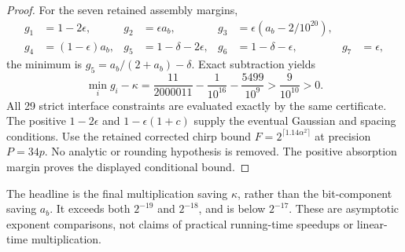 \begin{proof}
For the seven retained assembly margins,
\[
\begin{aligned}
 g_1&=1-2\epsilon,&g_2&=\epsilon a_b,&
 g_3&=\epsilon(a_b-2/10^{20}),\\
 g_4&=(1-\epsilon)a_b,&g_5&=1-\delta-2\epsilon,&
 g_6&=1-\delta-\epsilon,&g_7&=\epsilon,
\end{aligned}
\]
the minimum is $g_5=a_b/(2+a_b)-\delta$. Exact subtraction yields
\[
 \min_i g_i-\kappa
 =\frac{11}{2000011}-\frac1{10^{16}}-\frac{5499}{10^9}
 >\frac9{10^{10}}>0.
\]
All 29 strict interface constraints are evaluated exactly by the same
certificate. The positive $1-2\epsilon$ and $1-\epsilon(1+c)$ supply
the eventual Gaussian and spacing conditions. Use the retained corrected
chirp bound $F=2^{\lceil1.14\alpha^2\rceil}$ at precision $P=34p$.
No analytic or rounding hypothesis is removed. The positive absorption
margin proves the displayed conditional bound.
\end{proof}

The headline is the final multiplication saving $\kappa$, rather than
the bit-component saving $a_b$. It exceeds both $2^{-19}$ and $2^{-18}$,
and is below $2^{-17}$. These are asymptotic exponent comparisons, not
claims of practical running-time speedups or linear-time multiplication.

